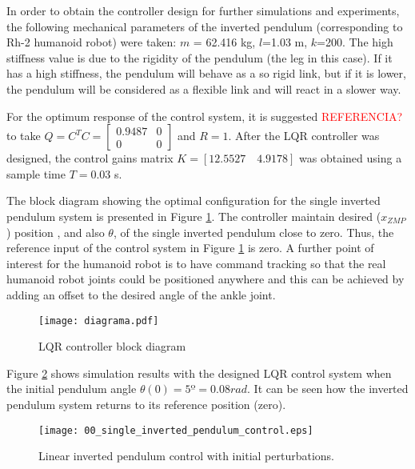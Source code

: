 In order to obtain the controller design for further simulations and experiments, the following mechanical parameters of the inverted pendulum (corresponding to Rh-2 humanoid robot) were taken: $m$ = 62.416 kg, $l$=1.03 m, $k$=200. The high stiffness value is due to the rigidity of the pendulum (the leg in this case). If it has a high stiffness, the pendulum will behave as a so rigid link, but if it is lower, the pendulum will be considered as a flexible link and will react in a slower way.

For the optimum response of the control system, it is suggested \textcolor{red}{REFERENCIA?} to take $Q = C^{T}C = \begin{bmatrix}
0.9487 & 0\\
0 & 0
\end{bmatrix}$ and $R = 1 $. 
After the LQR controller was designed, the control gains matrix $K = [12.5527 \quad 4.9178]$ was obtained using a sample time $T = 0.03$ s.

The block diagram showing the optimal configuration for the single inverted pendulum system is presented in Figure \ref{fig:block_diagram}. The controller maintain desired ($x_{ZMP}$) position , and also $\theta$, of the single inverted pendulum close to zero. Thus, the reference input of the control system in Figure \ref{fig:block_diagram} is zero. A further point of interest for the humanoid robot is to have command tracking so that the real humanoid robot joints could be positioned anywhere and this can be achieved by adding an offset to the desired angle of the ankle joint. 

\begin{figure}[!hbt]
\centering
\texttt{[image: diagrama.pdf]}
\caption{LQR controller block diagram}
\label{fig:block_diagram}
\end{figure}

Figure \ref{fig:pendulum_control} shows simulation results with the designed LQR control system when the initial pendulum angle $\theta(0)= 5º = 0.08 rad$. It can be seen how the inverted pendulum system returns to its reference position (zero).

\begin{figure}[!hbt]
\centering
\texttt{[image: 00\_single\_inverted\_pendulum\_control.eps]}
\caption{Linear inverted pendulum control with initial perturbations.}
\label{fig:pendulum_control}
\end{figure}

